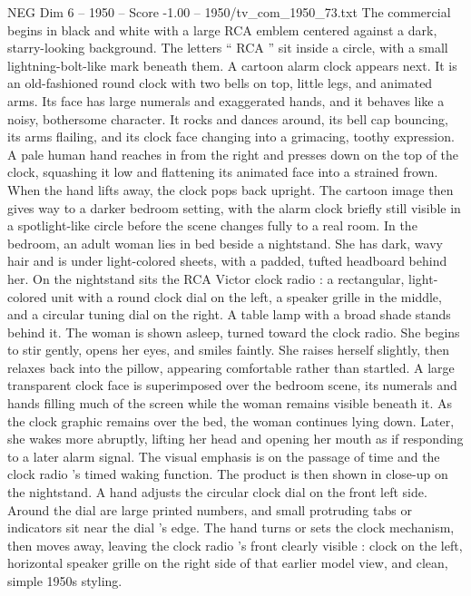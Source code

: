\begin{textsample}{NEG Dim 6 – 1950 – Score -1.00 – 1950/tv\_com\_1950\_73.txt}  \label{ex:f6_neg_081}
The commercial begins in black and white with a large RCA emblem centered against a dark, starry-looking background.
The letters “ RCA ” sit inside a circle, with a small lightning-bolt-like mark beneath them.
A cartoon alarm clock appears next.
It is an old-fashioned round clock with two bells on top, little legs, and animated arms.
Its face has large numerals and exaggerated hands, and it behaves like a noisy, bothersome character.
It rocks and dances around, its bell cap bouncing, its arms flailing, and its clock face changing into a grimacing, toothy expression.
A pale human hand reaches in from the right and presses down on the top of the clock, squashing it low and flattening its animated face into a strained frown.
When the hand lifts away, the clock pops back upright.
The cartoon image then gives way to a darker bedroom setting, with the alarm clock briefly still visible in a spotlight-like circle before the scene changes fully to a real room.
In the bedroom, an adult woman lies in bed beside a nightstand.
She has dark, wavy hair and is under light-colored sheets, with a padded, tufted headboard behind her.
On the nightstand sits the RCA Victor clock radio : a rectangular, light-colored unit with a round clock dial on the left, a speaker grille in the middle, and a circular tuning dial on the right.
A table lamp with a broad shade stands behind it.
The woman is shown asleep, turned toward the clock radio.
She begins to stir gently, opens her eyes, and smiles faintly.
She raises herself slightly, then relaxes back into the pillow, appearing comfortable rather than startled.
A large transparent clock face is superimposed over the bedroom scene, its numerals and hands filling much of the screen while the woman remains visible beneath it.
As the clock graphic remains over the bed, the woman continues lying down.
Later, she wakes more abruptly, lifting her head and opening her mouth as if responding to a later alarm signal.
The visual emphasis is on the passage of time and the clock radio ’s timed waking function.
The product is then shown in close-up on the nightstand.
A hand adjusts the circular clock dial on the front left side.
Around the dial are large printed numbers, and small protruding tabs or indicators sit near the dial ’s edge.
The hand turns or sets the clock mechanism, then moves away, leaving the clock radio ’s front clearly visible : clock on the left, horizontal speaker grille on the right side of that earlier model view, and clean, simple 1950s styling.

\end{textsample}
